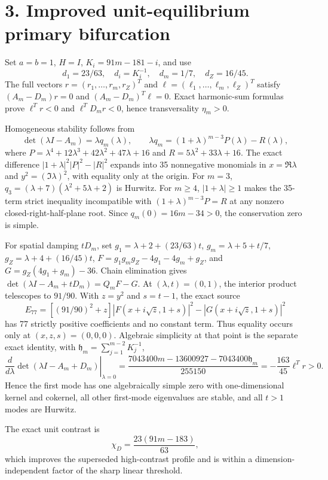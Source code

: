 \documentclass[10pt]{article}
\begin{document}
\newpage
\section*{3. Improved unit-equilibrium primary bifurcation}
Set $a=b=1$, $H=I$, $K_i=91m-181-i$, and use
\[
d_1=23/63,\quad d_i=K_i^{-1},\quad d_m=1/7,\quad d_Z=16/45.
\]
The full vectors $r=(r_1,\ldots,r_m,r_Z)^T$ and
$\ell=(\ell_1,\ldots,\ell_m,\ell_Z)^T$ satisfy
$(A_m-D_m)r=0$ and $(A_m-D_m)^T\ell=0$. Exact harmonic-sum formulas prove $\ell^Tr<0$ and $\ell^TD_mr<0$, hence transversality $\eta_m>0$.

Homogeneous stability follows from
\[
\det(\lambda I-A_m)=\lambda q_m(\lambda),\qquad
\lambda q_m=(1+\lambda)^{m-3}P(\lambda)-R(\lambda),
\]
where $P=\lambda^4+12\lambda^3+42\lambda^2+47\lambda+16$ and $R=5\lambda^2+33\lambda+16$. The exact difference $|1+\lambda|^2|P|^2-|R|^2$ expands into 35 nonnegative monomials in $x=\Re\lambda$ and $y^2=(\Im\lambda)^2$, with equality only at the origin.
For $m=3$, $q_3=(\lambda+7)(\lambda^2+5\lambda+2)$ is Hurwitz.  For
$m\ge4$, $|1+\lambda|\ge1$ makes the 35-term strict inequality incompatible
with $(1+\lambda)^{m-3}P=R$ at any nonzero closed-right-half-plane root.
Since $q_m(0)=16m-34>0$, the conservation zero is simple.

For spatial damping $tD_m$, set
$g_1=\lambda+2+(23/63)t$, $g_m=\lambda+5+t/7$,
$g_Z=\lambda+4+(16/45)t$,
$F=g_1g_mg_Z-4g_1-4g_m+g_Z$, and $G=g_Z(4g_1+g_m)-36$.
Chain elimination gives $\det(\lambda I-A_m+tD_m)=Q_mF-G$.
At $(\lambda,t)=(0,1)$, the interior
product telescopes to $91/90$.  With $z=y^2$ and $s=t-1$, the exact source
\[
E_{77}=\left[(91/90)^2+z\right]|F(x+i\sqrt z,1+s)|^2
-|G(x+i\sqrt z,1+s)|^2
\]
has 77 strictly positive coefficients and no constant term.  Thus equality
occurs only at $(x,z,s)=(0,0,0)$.  Algebraic simplicity at that point is the
separate exact identity, with
$\mathfrak h_m=\sum_{j=1}^{m-2}K_j^{-1}$,
\[
 \left.\frac{d}{d\lambda}\det(\lambda I-A_m+D_m)\right|_{\lambda=0}
 =\frac{7043400m-13600927-7043400\mathfrak h_m}{255150}
 =-\frac{163}{45}\ell^Tr>0.
\]
Hence the first mode has one algebraically simple zero with one-dimensional
kernel and cokernel, all other first-mode eigenvalues are stable, and all
$t>1$ modes are Hurwitz.

The exact unit contrast is
\[
\chi_D=\frac{23(91m-183)}{63},
\]
which improves the superseded high-contrast profile and is within a dimension-independent factor of the sharp linear threshold.

\newpage
\end{document}
